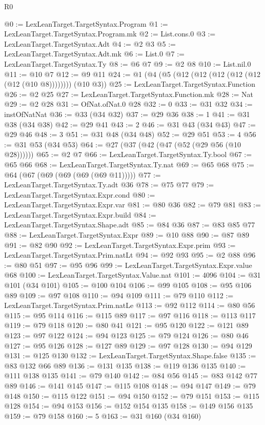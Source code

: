 \begin{lexlean}{R0}
\begin{coremodule}
@0 := LexLeanTarget.TargetSyntax.Program
@1 := LexLeanTarget.TargetSyntax.Program.mk
@2 := List.cons.{0}
@3 := LexLeanTarget.TargetSyntax.Adt
@4 := @2 @3
@5 := LexLeanTarget.TargetSyntax.Adt.mk
@6 := List.{0}
@7 := LexLeanTarget.TargetSyntax.Ty
@8 := @6 @7
@9 := @2 @8
@10 := List.nil.{0}
@11 := @10 @7
@12 := @9 @11
@24 := @1 (@4 (@5 (@12 (@12 (@12 (@12 (@12 (@12 (@10 @8)))))))) (@10 @3))
@25 := LexLeanTarget.TargetSyntax.Function
@26 := @2 @25
@27 := LexLeanTarget.TargetSyntax.Function.mk
@28 := Nat
@29 := @2 @28
@31 := OfNat.ofNat.{0} @28
@32 := 0
@33 := @31 @32
@34 := instOfNatNat
@36 := @33 (@34 @32)
@37 := @29 @36
@38 := 1
@41 := @31 @38 (@34 @38)
@42 := @29 @41
@43 := 2
@46 := @31 @43 (@34 @43)
@47 := @29 @46
@48 := 3
@51 := @31 @48 (@34 @48)
@52 := @29 @51
@53 := 4
@56 := @31 @53 (@34 @53)
@64 := @27 (@37 (@42 (@47 (@52 (@29 @56 (@10 @28))))))
@65 := @2 @7
@66 := LexLeanTarget.TargetSyntax.Ty.bool
@67 := @65 @66
@68 := LexLeanTarget.TargetSyntax.Ty.nat
@69 := @65 @68
@75 := @64 (@67 (@69 (@69 (@69 (@69 @11)))))
@77 := LexLeanTarget.TargetSyntax.Ty.adt @36
@78 := @75 @77
@79 := LexLeanTarget.TargetSyntax.Expr.cond
@80 := LexLeanTarget.TargetSyntax.Expr.var
@81 := @80 @36
@82 := @79 @81
@83 := LexLeanTarget.TargetSyntax.Expr.build
@84 := LexLeanTarget.TargetSyntax.Shape.adt
@85 := @84 @36
@87 := @83 @85 @77
@88 := LexLeanTarget.TargetSyntax.Expr
@89 := @10 @88
@90 := @87 @89
@91 := @82 @90
@92 := LexLeanTarget.TargetSyntax.Expr.prim
@93 := LexLeanTarget.TargetSyntax.Prim.natLt
@94 := @92 @93
@95 := @2 @88
@96 := @80 @51
@97 := @95 @96
@99 := LexLeanTarget.TargetSyntax.Expr.value @68
@100 := LexLeanTarget.TargetSyntax.Value.nat
@101 := 4096
@104 := @31 @101 (@34 @101)
@105 := @100 @104
@106 := @99 @105
@108 := @95 @106 @89
@109 := @97 @108
@110 := @94 @109
@111 := @79 @110
@112 := LexLeanTarget.TargetSyntax.Prim.natLe
@113 := @92 @112
@114 := @80 @56
@115 := @95 @114
@116 := @115 @89
@117 := @97 @116
@118 := @113 @117
@119 := @79 @118
@120 := @80 @41
@121 := @95 @120
@122 := @121 @89
@123 := @97 @122
@124 := @94 @123
@125 := @79 @124
@126 := @80 @46
@127 := @95 @126
@128 := @127 @89
@129 := @97 @128
@130 := @94 @129
@131 := @125 @130
@132 := LexLeanTarget.TargetSyntax.Shape.false
@135 := @83 @132 @66 @89
@136 := @131 @135
@138 := @119 @136 @135
@140 := @111 @138 @135
@141 := @79 @140
@142 := @84 @56
@145 := @83 @142 @77 @89
@146 := @141 @145
@147 := @115 @108
@148 := @94 @147
@149 := @79 @148
@150 := @115 @122
@151 := @94 @150
@152 := @79 @151
@153 := @115 @128
@154 := @94 @153
@156 := @152 @154 @135
@158 := @149 @156 @135
@159 := @79 @158
@160 := 5
@163 := @31 @160 (@34 @160)

\end{coremodule}
\end{lexlean}
